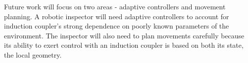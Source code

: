 \documentclass[10pt]{article}
\begin{document}
Future work will focus on two areas - adaptive controllers and movement planning. A robotic inspector will need adaptive controllers to account for induction coupler's strong dependence on poorly known parameters of the environment.  The inspector will also need to plan movements carefully because its ability to exert control with an induction coupler is based on both its state, the local geometry.      
\end{document}
